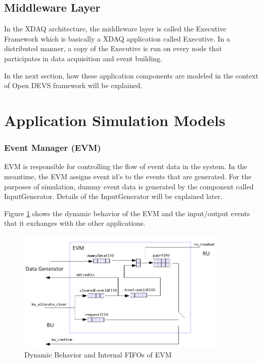 \subsection{Middleware Layer}
In the XDAQ architecture, the middleware layer is called the Executive Framework which is basically a XDAQ application called Executive. In a distributed manner, a copy of the Executive is run on every node that participates in data acquisition and event building. 

In the next section, how these application components are modeled in the context of Open DEVS framework will be explained.

\section{Application Simulation Models}

\subsubsection{Event Manager (EVM)}
EVM is responsible for controlling the flow of event data in the system. In the meantime, the EVM assigns event id's to the events that are generated. For the purposes of simulation, dummy event data is generated by the component called InputGenerator. Details of the InputGenerator will be explained later.

Figure \ref{fig:evm_behavior} shows the dynamic behavior of the EVM and the input/output events that it exchanges with the other applications.

\begin{figure}
	\centering
		\includegraphics[width=0.90\textwidth]{figures/evm_behavior.png}
	\caption{Dynamic Behavior and Internal FIFOs of EVM}
	\label{fig:evm_behavior}
\end{figure}


